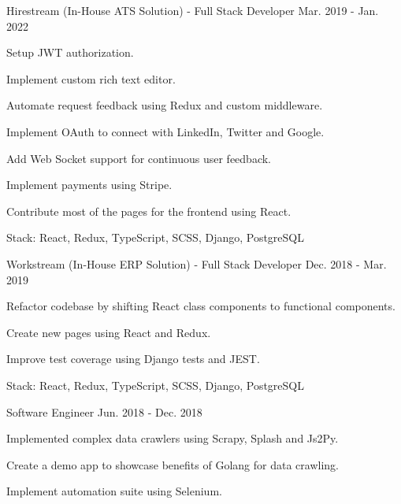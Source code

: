 \begin{cventries}
  \cventry
    {Hirestream (In-House ATS Solution) - Full Stack Developer} %
    {} %
    {} %
    {Mar. 2019 - Jan. 2022} %
    {
      \begin{cvitems} %
        \item {Setup JWT authorization.}
        \item {Implement custom rich text editor.}
        \item {Automate request feedback using Redux and custom middleware.}
        \item {Implement OAuth to connect with LinkedIn, Twitter and Google.}
        \item {Add Web Socket support for continuous user feedback.}
        \item {Implement payments using Stripe.}
        \item {Contribute most of the pages for the frontend using React.}
        \item {Stack: React, Redux, TypeScript, SCSS, Django, PostgreSQL}
      \end{cvitems}
    }

  \cventry
    {Workstream (In-House ERP Solution) - Full Stack Developer} %
    {} %
    {} %
    {Dec. 2018 - Mar. 2019} %
    {
      \begin{cvitems} %
        \item {Refactor codebase by shifting React class components to functional components.}
        \item {Create new pages using React and Redux.}
        \item {Improve test coverage using Django tests and JEST.}
        \item {Stack: React, Redux, TypeScript, SCSS, Django, PostgreSQL}
      \end{cvitems}
    }

  \cventry
    {Software Engineer} %
    {} %
    {} %
    {Jun. 2018 - Dec. 2018} %
    {
      \begin{cvitems} %
        \item {Implemented complex data crawlers using Scrapy, Splash and Js2Py.}
        \item {Create a demo app to showcase benefits of Golang for data crawling.}
        \item {Implement automation suite using Selenium.}
      \end{cvitems}
    }

\end{cventries}
